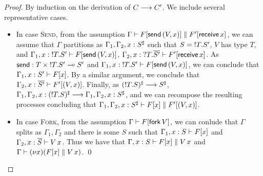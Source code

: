 \documentclass[oribibl,orivec,envcountsame]{llncs}
\begin{document}
\begin{proof}
  By induction on the derivation of $C \longrightarrow C'$.  We include several representative cases.
  \begin{itemize}
  \item In case \textsc{Send}, from the assumption $\Gamma \vdash F[\mathsf{send}\,(V,x)] \parallel
    F'[\mathsf{receive} \, x]$, we can assume that $\Gamma$ partitions as
    $\Gamma_1,\Gamma_2,x:S^\sharp$ such that $S = {!T.S'}$, $V$ has type $T$, and
    $\Gamma_1,x:{!T.S'} \vdash F[\mathsf{send} \, (V,x)]$,
    $\Gamma_2,x:{?T.\overline{S'}} \vdash F'[\mathsf{receive} \, x]$.  As $\mathsf{send} : T
    \times {!T.S'} \multimap S'$ and $\Gamma_1,x:{!T.S'} \vdash F[\mathsf{send} \,
    (V,x)]$, we can conclude that $\Gamma_1,x:S' \vdash F[x]$.  By a similar argument, we conclude
    that $\Gamma_2,x:\overline{S'} \vdash F'[(V,x)]$. Finally, as $({!T.S})^\sharp \longrightarrow
    S^\sharp$, $\Gamma_1,\Gamma_2,x:({!T.S})^\sharp \longrightarrow
    \Gamma_1,\Gamma_2,x:S^\sharp$, and we can recompose the resulting processes concluding that
    $\Gamma_1,\Gamma_2,x:S^\sharp \vdash F[x] \parallel F'[(V,x)]$.
  \item In case \textsc{Fork}, from the assumption $\Gamma \vdash F[\mathsf{fork} \, V]$, we
    can conlude that $\Gamma$ splits as $\Gamma_1,\Gamma_2$ and there is some $S$ such that
    $\Gamma_1,x:S \vdash F[x]$ and $\Gamma_2,x:\overline{S} \vdash V \, x$.  Thus we have that
    $\Gamma,x:S \vdash F[x] \parallel V \, x$ and $\Gamma \vdash (\nu x)(F[x] \parallel V \,
    x)$.
    \qed
  \end{itemize}
\end{proof}
\end{document}
